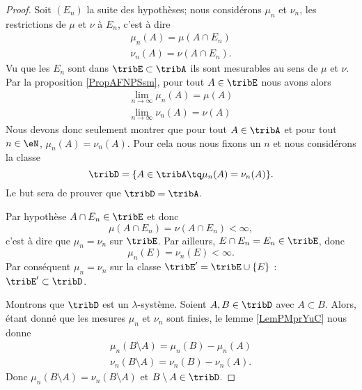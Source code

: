 \begin{proof}
    Soit \( (E_n)\) la suite des hypothèses; nous considérons \( \mu_n\) et \( \nu_n\), les restrictions de \( \mu\) et \( \nu\) à \( E_n\), c'est à dire
    \begin{subequations}
        \begin{align}
        \mu_n(A)=\mu(A\cap E_n)\\
        \nu_n(A)=\nu(A\cap E_n).
        \end{align}
    \end{subequations}
    Vu que les \( E_n\) sont dans \( \tribE\subset\tribA\) ils sont mesurables au sens de \( \mu\) et \( \nu\). Par la proposition \ref{PropAFNPSsm}, pour tout \( A\in \tribE\) nous avons alors
    \begin{subequations}
        \begin{align}
            \lim_{n\to \infty} \mu_n(A)=\mu(A)\\
            \lim_{n\to \infty} \nu_n(A)=\nu(A)
        \end{align}
    \end{subequations}
    Nous devons donc seulement montrer que pour tout \( A\in\tribA\) et pour tout \( n\in\eN\), \( \mu_n(A)=\nu_n(A)\). Pour cela nous nous fixons un \( n\) et nous considérons la classe
    \begin{equation}
        \tribD=\{ A\in\tribA\tq\mu_n(A)=\nu_n(A) \}.
    \end{equation}
    Le but sera de prouver que \( \tribD=\tribA\).
    
    
    Par hypothèse \( A\cap E_n\in\tribE\) et donc
    \begin{equation}
        \mu(A\cap E_n)=\nu(A\cap E_n)<\infty,
    \end{equation}
    c'est à dire que \( \mu_n=\nu_n\) sur \( \tribE\). Par ailleurs, \( E\cap E_n=E_n\in\tribE\), donc
    \begin{equation}
        \mu_n(E)=\nu_n(E)<\infty.
    \end{equation}
    Par conséquent \( \mu_n=\nu_n\) sur la classe \( \tribE'=\tribE\cup\{ E \}\) : \( \tribE'\subset\tribD\).

    Montrons que \( \tribD\) est un \( \lambda\)-système. Soient \( A,B\in\tribD\) avec \( A\subset B\). Alors, étant donné que les mesures \( \mu_n\) et \( \nu_n\) sont finies, le lemme \ref{LemPMprYuC} nous donne
    \begin{subequations}
        \begin{align}
            \mu_n(B\setminus A)=\mu_n(B)-\mu_n(A)\\
            \nu_n(B\setminus A)=\nu_n(B)-\nu_n(A).
        \end{align}
    \end{subequations}
    Donc \( \mu_n(B\setminus A)=\nu_n(B\setminus A)\) et \( B\setminus A\in\tribD\).


\end{proof}
